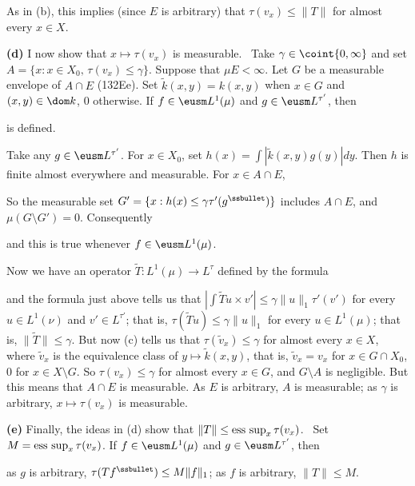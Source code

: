 {As in (b), this implies (since $E$ is arbitrary) that
$\tau(v_x)\le\|T\|$ for almost every $x\in X$.\ \Qed

\medskip

{\bf (d)} I now show that $x\mapsto\tau(v_x)$ is measurable.   \Prf\
Take $\gamma\in\coint{0,\infty}$ and set
$A=\{x:x\in X_0,\,\tau(v_x)\le\gamma\}$.   Suppose that $\mu E<\infty$.
Let $G$ be a measurable envelope of $A\cap E$ (132Ee).   Set
$\tilde k(x,y)=k(x,y)$ when $x\in G$ and $(x,y)\in\dom k$, $0$
otherwise.   If $f\in\eusm L^1(\mu)$ and $g\in\eusm L^{\tau'}$, then


\noindent is defined.

Take any $g\in\eusm L^{\tau'}$.
For $x\in X_0$, set $h(x)=\int|\tilde k(x,y)g(y)|dy$.   Then $h$ is
finite almost everywhere and measurable.   For $x\in A\cap E$,


\noindent So the measurable set
$G'=\{x:h(x)\le\gamma\tau'(g^{\ssbullet})\}$ includes $A\cap E$, and
$\mu(G\setminus G')=0$.   Consequently

\Centerline{$|\int\tilde k(x,y)f(x)g(y)d(x,y)|\le\int_G|f(x)|h(x)dx
\le\gamma\|f\|_1\tau'(g^{\ssbullet})$,}

\noindent and this is true whenever $f\in\eusm L^1(\mu)$.

Now we have an operator $\tilde T:L^1(\mu)\to L^{\tau}$ defined by the
formula


\noindent and the formula just above tells us that
$|\int\tilde Tu\times v'|\le\gamma\|u\|_1\tau'(v')$ for every
$u\in L^1(\nu)$ and $v'\in L^{\tau'}$;  that is,
$\tau(\tilde Tu)\le\gamma\|u\|_1$ for every $u\in L^1(\mu)$;  that is,
$\|\tilde T\|\le\gamma$.   But now (c) tells us
that $\tau(\tilde v_x)\le\gamma$ for almost every $x\in X$, where
$\tilde v_x$ is the equivalence class of $y\mapsto \tilde k(x,y)$, that
is, $\tilde v_x=v_x$ for $x\in G\cap X_0$, $0$ for $x\in X\setminus G$.
So $\tau(v_x)\le\gamma$ for almost every $x\in G$, and $G\setminus A$ is
negligible.   But this means that $A\cap E$ is measurable.   As $E$ is
arbitrary, $A$ is measurable;  as $\gamma$ is arbitrary,
$x\mapsto\tau(v_x)$ is measurable.\ \Qed

\medskip

{\bf (e)} Finally, the ideas in (d) show that
$\|T\|\le\mathop{\text{ess sup}}_x\tau(v_x)$.   \Prf\ Set $M=\mathop{\text{ess sup}}_x\tau(v_x)$.   If
$f\in\eusm L^1(\mu)$ and $g\in\eusm L^{\tau'}$, then


\noindent as $g$ is arbitrary, $\tau(Tf^{\ssbullet})\le M\|f\|_1$;  as
$f$ is arbitrary, $\|T\|\le M$.\ \Qed
}%

